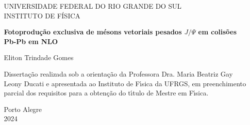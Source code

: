 \begin{titlepage}
\begin{center}\Large
{UNIVERSIDADE FEDERAL DO RIO GRANDE DO SUL \\
INSTITUTO DE FÍSICA}
\end{center}
\vfill
\begin{center}\Large
\renewcommand{\thefootnote}{\fnsymbol{footnote}}
\setcounter{footnote}{1}
{\bf Fotoprodução exclusiva de mésons vetoriais  pesados $J/\Psi$ em colisões Pb-Pb em NLO}%
\end{center}

\bigskip

\begin{center}
\Large
Eliton Trindade Gomes
\end{center}
\bigskip

\vfill
\hfill
\begin{minipage}[b]{0.6\textwidth}
Disserta\c{c}\~ao  realizada sob a orienta\c{c}\~ao da Professora Dra.
Maria Beatriz Gay Leony Ducati e apresentada ao
Instituto de F\'{\i}sica da UFRGS, em preenchimento
parcial dos requisitos para a obten\c{c}\~ao do t\'{\i}tulo
de Mestre em F\'{\i}sica.
\end{minipage}
\setcounter{footnote}{0}
\renewcommand{\thefootnote}{\arabic{footnote}}
\vfill
\begin{center}
{Porto Alegre \\ 2024}
\end{center}
\end{titlepage}
